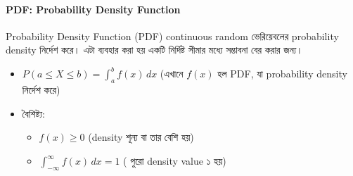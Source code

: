 \documentclass[graybox, envcountchap, twocolumn]{styles/svmult}
\begin{document}

\paragraph{PDF: Probability Density Function}

{\bengalifont Probability Density Function (PDF) continuous random ভেরিয়েবলের probability density নির্দেশ করে। এটা ব্যবহার করা হয় একটি নির্দিষ্ট সীমার মধ্যে সম্ভাবনা বের করার জন্য। }

\begin{itemize}
    \item $P(a \leq X \leq b) = \int_{a}^{b} f(x) \, dx$ {\bengalifont (এখানে $f(x)$ হল PDF, যা probability density নির্দেশ করে)}
    \item {\bengalifont বৈশিষ্ট্য:}
    \begin{itemize}
        \item $f(x) \geq 0$ {\bengalifont (density  শূন্য বা তার বেশি হয়)}
        \item $\int_{-\infty}^{\infty} f(x) \, dx = 1$ {\bengalifont ( পুরো density value ১ হয়)}
    \end{itemize}
\end{itemize}



\end{document}

